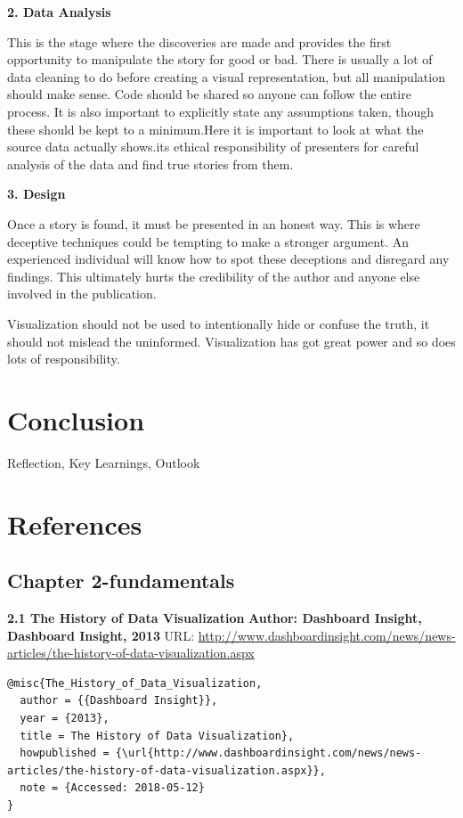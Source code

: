 \documentclass[]{book}
\theoremstyle{definition}
\theoremstyle{definition}
\theoremstyle{definition}
\theoremstyle{remark}
\begin{document}
\textbf{2. Data Analysis}

This is the stage where the discoveries are made and provides the first
opportunity to manipulate the story for good or bad. There is usually a
lot of data cleaning to do before creating a visual representation, but
all manipulation should make sense. Code should be shared so anyone can
follow the entire process. It is also important to explicitly state any
assumptions taken, though these should be kept to a minimum.Here it is
important to look at what the source data actually shows.its ethical
responsibility of presenters for careful analysis of the data and find
true stories from them.

\textbf{3. Design}

Once a story is found, it must be presented in an honest way. This is
where deceptive techniques could be tempting to make a stronger
argument. An experienced individual will know how to spot these
deceptions and disregard any findings. This ultimately hurts the
credibility of the author and anyone else involved in the publication.

Visualization should not be used to intentionally hide or confuse the
truth, it should not mislead the uninformed. Visualization has got great
power and so does lots of responsibility.

\chapter{Conclusion}\label{conclusion}

Reflection, Key Learnings, Outlook

\chapter*{References}\label{references-1}

\section{Chapter 2-fundamentals}\label{chapter-2-fundamentals}

\textbf{2.1 The History of Data Visualization} \textbf{Author: Dashboard
Insight, Dashboard Insight, 2013} URL:
\url{http://www.dashboardinsight.com/news/news-articles/the-history-of-data-visualization.aspx}

\citep{The_History_of_Data_Visualization}

\begin{verbatim}
@misc{The_History_of_Data_Visualization,
  author = {{Dashboard Insight}},
  year = {2013},
  title = The History of Data Visualization},
  howpublished = {\url{http://www.dashboardinsight.com/news/news-articles/the-history-of-data-visualization.aspx}},
  note = {Accessed: 2018-05-12}
}
\end{verbatim}
\end{document}
